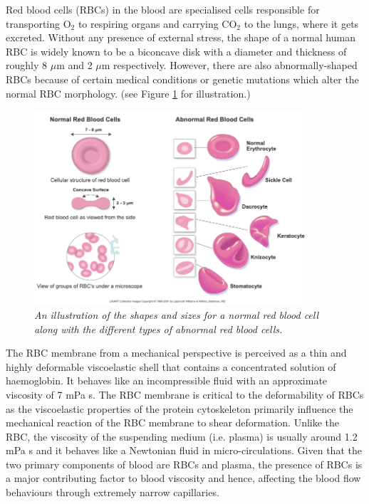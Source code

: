 \noindent Red blood cells (RBCs) in the blood are specialised cells responsible for transporting O$_{2}$ to respiring organs and carrying CO$_{2}$ to the lungs, where it gets excreted.\cite{redbloodcells} Without any presence of external stress, the shape of a normal human RBC is widely known to be a biconcave disk with a diameter and thickness of roughly 8 $\mu$m and 2 $\mu$m respectively.\cite{Jung1971PermeabilitySugars} However, there are also abnormally-shaped RBCs because of certain medical conditions or genetic mutations which alter the normal RBC morphology. (see Figure \ref{RedBloodCell} for illustration.)

\begin{figure}[H]
\centering
\includegraphics[width=0.9\textwidth]{images/RedBloodCellDescription.png}
\caption{\textit{An illustration of the shapes and sizes for a normal red blood cell along with the different types of abnormal red blood cells.  \cite{RedBloodCellsDescription, LifeART2000}} \label{RedBloodCell}}
\end{figure}

\noindent The RBC membrane from a mechanical perspective is perceived as a thin and highly deformable viscoelastic shell that contains a concentrated solution of haemoglobin. It behaves like an incompressible fluid with an approximate viscosity of 7 mPa s.\cite{chien1975red} The RBC membrane is critical to the deformability of RBCs as the viscoelastic properties of the protein cytoskeleton primarily influence the mechanical reaction of the RBC membrane to shear deformation.\cite{EvansE.A1976Mv} Unlike the RBC, the viscosity of the suspending medium (i.e. plasma) is usually around 1.2 mPa s and it behaves like a Newtonian fluid in micro-circulations. Given that the two primary components of blood are RBCs and plasma, the presence of RBCs is a major contributing factor to blood viscosity and hence, affecting the blood flow behaviours through extremely narrow capillaries. \\ 


